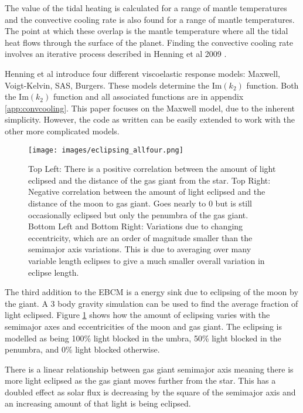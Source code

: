 \documentclass[12pt, onecolumn]{revtex4-2}    %
\begin{document}
The value of the tidal heating is calculated for a range of mantle temperatures and the convective cooling rate is also found for a range of mantle temperatures.
The point at which these overlap is the mantle temperature where all the tidal heat flows through the surface of the planet.
Finding the convective cooling rate involves an iterative process described in Henning et al 2009 \cite{Henning2009}.

Henning et al introduce four different viscoelastic response models: Maxwell, Voigt-Kelvin, SAS, Burgers.
These models determine the Im$(k_2)$ function.
Both the Im$(k_2)$ function and all associated functions are in appendix \ref{app:convcooling}.
This paper focuses on the Maxwell model, due to the inherent simplicity.
However, the code as written can be easily extended to work with the other more complicated models.

\begin{figure}
    \texttt{[image: images/eclipsing\_allfour.png]}
    \caption{
        Top Left: There is a positive correlation between the amount of light eclipsed and the distance of the gas giant from the star.
        Top Right: Negative correlation between the amount of light eclipsed and the distance of the moon to gas giant.
        Goes nearly to 0 but is still occasionally eclipsed but only the penumbra of the gas giant.
        Bottom Left and Bottom Right: Variations due to changing eccentricity, which are an order of magnitude smaller than the semimajor axis variations.
        This is due to averaging over many variable length eclipses to give a much smaller overall variation in eclipse length.
    }
    \label{fig:eclipsing}
\end{figure}

The third addition to the EBCM is a energy sink due to eclipsing of the moon by the giant.
A 3 body gravity simulation can be used to find the average fraction of light eclipsed.
Figure \ref{fig:eclipsing} shows how the amount of eclipsing varies with the semimajor axes and eccentricities of the moon and gas giant.
The eclipsing is modelled as being 100\% light blocked in the umbra, 50\% light blocked in the penumbra, and 0\% light blocked otherwise.

There is a linear relationship between gas giant semimajor axis meaning there is more light eclipsed as the gas giant moves further from the star.
This has a doubled effect as solar flux is decreasing by the square of the semimajor axis and an increasing amount of that light is being eclipsed.
\end{document}
